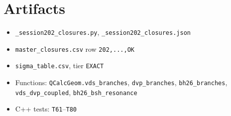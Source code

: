 \documentclass[11pt,letterpaper]{article}
\begin{document}
\section*{Artifacts}
\begin{itemize}
  \item \texttt{\_session202\_closures.py}, \texttt{\_session202\_closures.json}
  \item \texttt{master\_closures.csv} row \texttt{202,...,OK}
  \item \texttt{sigma\_table.csv}, tier \texttt{EXACT}
  \item Functions: \texttt{QCalcGeom.vds\_branches}, \texttt{dvp\_branches},
        \texttt{bh26\_branches}, \texttt{vds\_dvp\_coupled},
        \texttt{bh26\_bsh\_resonance}
  \item C++ tests: \texttt{T61}--\texttt{T80}
\end{itemize}
\end{document}
